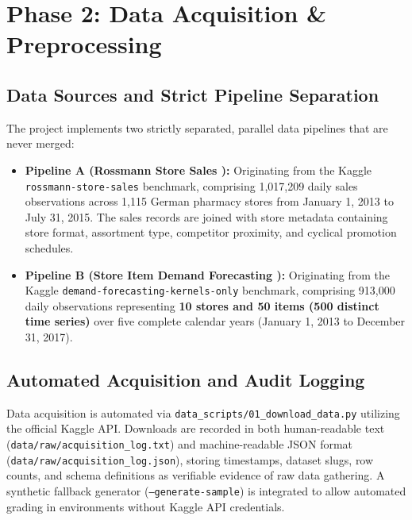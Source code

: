 \documentclass[11pt,a4paper]{article}
\begin{document}
\FloatBarrier
\newpage

\section{Phase 2: Data Acquisition \& Preprocessing}

\subsection{Data Sources and Strict Pipeline Separation}
The project implements two strictly separated, parallel data pipelines that are never merged:
\begin{itemize}
    \item \textbf{Pipeline A (Rossmann Store Sales \cite{rossmann_kaggle}):} Originating from the Kaggle \texttt{rossmann-store-sales} benchmark, comprising 1,017,209 daily sales observations across 1,115 German pharmacy stores from January 1, 2013 to July 31, 2015. The sales records are joined with store metadata containing store format, assortment type, competitor proximity, and cyclical promotion schedules.
    \item \textbf{Pipeline B (Store Item Demand Forecasting \cite{store_item_kaggle}):} Originating from the Kaggle \texttt{demand-forecasting-kernels-only} benchmark, comprising 913,000 daily observations representing \textbf{10 stores and 50 items (500 distinct time series)} over five complete calendar years (January 1, 2013 to December 31, 2017).
\end{itemize}

\subsection{Automated Acquisition and Audit Logging}
Data acquisition is automated via \texttt{data\_scripts/01\_download\_data.py} utilizing the official Kaggle API. Downloads are recorded in both human-readable text (\texttt{data/raw/acquisition\_log.txt}) and machine-readable JSON format (\texttt{data/raw/acquisition\_log.json}), storing timestamps, dataset slugs, row counts, and schema definitions as verifiable evidence of raw data gathering. A synthetic fallback generator (\texttt{--generate-sample}) is integrated to allow automated grading in environments without Kaggle API credentials.
\end{document}
